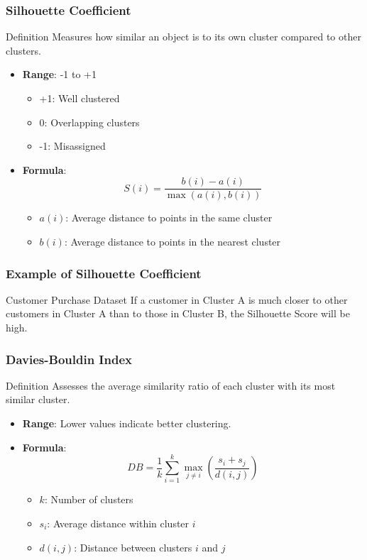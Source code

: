 \documentclass[aspectratio=169]{beamer}
\begin{document}
\begin{frame}[fragile]
    \frametitle{Silhouette Coefficient}
    \begin{block}{Definition}
        Measures how similar an object is to its own cluster compared to other clusters.
    \end{block}
    \begin{itemize}
        \item \textbf{Range}: -1 to +1
        \begin{itemize}
            \item +1: Well clustered
            \item 0: Overlapping clusters
            \item -1: Misassigned
        \end{itemize}
        \item \textbf{Formula}:
        \[
        S(i) = \frac{b(i) - a(i)}{\max(a(i), b(i))}
        \]
        \begin{itemize}
            \item \( a(i) \): Average distance to points in the same cluster
            \item \( b(i) \): Average distance to points in the nearest cluster
        \end{itemize}
    \end{itemize}
\end{frame}

\begin{frame}[fragile]
    \frametitle{Example of Silhouette Coefficient}
    \begin{block}{Customer Purchase Dataset}
        If a customer in Cluster A is much closer to other customers in Cluster A than to those in Cluster B, the Silhouette Score will be high.
    \end{block}
\end{frame}

\begin{frame}[fragile]
    \frametitle{Davies-Bouldin Index}
    \begin{block}{Definition}
        Assesses the average similarity ratio of each cluster with its most similar cluster.
    \end{block}
    \begin{itemize}
        \item \textbf{Range}: Lower values indicate better clustering.
        \item \textbf{Formula}:
        \[
        DB = \frac{1}{k} \sum_{i=1}^{k} \max_{j \neq i} \left(\frac{s_i + s_j}{d(i, j)}\right)
        \]
        \begin{itemize}
            \item \( k \): Number of clusters
            \item \( s_i \): Average distance within cluster \( i \)
            \item \( d(i,j) \): Distance between clusters \( i \) and \( j \)
        \end{itemize}
    \end{itemize}
\end{frame}
\end{document}
